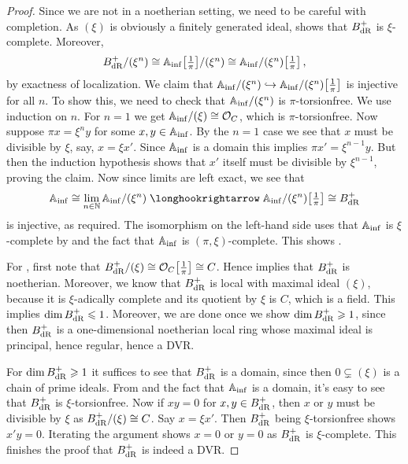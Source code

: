 \begin{proof}
	Since we are not in a noetherian setting, we need to be careful with completion. As $(\xi)$ is obviously a finitely generated ideal, \cite[]{stacks-project} shows that $B_{\mathrm{dR}}^+$ is $\xi$-complete. Moreover,
	\begin{equation*}
		B_{\mathrm{dR}}^+/(\xi^n)\cong \mathbb{A}_{\mathrm{inf}}\big[\textstyle\frac1\pi\big]/(\xi^n)\cong \mathbb{A}_{\mathrm{inf}}/(\xi^n)\big[\textstyle\frac1\pi\big]\,,
	\end{equation*}
	by exactness of localization. We claim that $\IA_\inf/(\xi^n)\monomorphism \IA_\inf/(\xi^n)\localize{\pi}$ is injective for all $n$. To show this, we need to check that $\mathbb{A}_{\mathrm{inf}}/(\xi^n)$ is $\pi$-torsionfree. We use induction on $n$. For $n=1$ we get $\mathbb{A}_{\mathrm{inf}}/(\xi)\cong \mathcal{O}_C$, which is $\pi$-torsionfree. Now suppose $\pi x=\xi^ny$ for some $x,y\in\mathbb{A}_{\mathrm{inf}}$. By the $n=1$ case we see that $x$ must be divisible by $\xi$, say, $x=\xi x'$. Since $\mathbb{A}_{\mathrm{inf}}$ is a domain this implies $\pi x'=\xi^{n-1}y$. But then the induction hypothesis shows that $x'$ itself must be divisible by $\xi^{n-1}$, proving the claim.
	Now since limits are left exact, we see that
	\begin{align*}
		\IA_\inf\cong \lim_{n\in \IN}\IA_\inf/(\xi^n)\monomorphism \IA_\inf/(\xi^n)\localize{\pi}\cong B_\dR^+
	\end{align*}
	is injective, as required. The isomorphism on the left-hand side uses that $\mathbb{A}_{\mathrm{inf}}$ is $\xi$-complete by \cite[]{stacks-project} and the fact that $\mathbb{A}_{\mathrm{inf}}$ is $(\pi,\xi)$-complete. This shows .
	
	For , first note that $B_{\mathrm{dR}}^+/(\xi)\cong \mathcal{O}_C\big[\textstyle\frac{1}{\pi}\big]\cong C$. Hence \cite[]{stacks-project} implies that $B_{\mathrm{dR}}^+$ is noetherian. Moreover, we know that $B_{\mathrm{dR}}^+$ is local with maximal ideal $(\xi)$, because it is $\xi$-adically complete and its quotient by $\xi$ is $C$, which is a field. This implies $\dim B_{\mathrm{dR}}^+\leqslant 1$. Moreover, we are done once we show $\dim B_{\mathrm{dR}}^+\geqslant 1$, since then $B_{\mathrm{dR}}^+$ is a one-dimensional noetherian local ring whose maximal ideal is principal, hence regular, hence a DVR.
	
	For $\dim B_{\mathrm{dR}}^+\geqslant 1$ it suffices to see that $B_{\mathrm{dR}}^+$ is a domain, since then $0\subsetneq (\xi)$ is a chain of prime ideals. From  and the fact that $\mathbb{A}_{\mathrm{inf}}$ is a domain, it's easy to see that $B_{\mathrm{dR}}^+$ is $\xi$-torsionfree. Now if $xy=0$ for $x,y\in B_{\mathrm{dR}}^+$, then $x$ or $y$ must be divisible by $\xi$ as $B_{\mathrm{dR}}^+/(\xi)\cong C$. Say $x=\xi x'$. Then $B_{\mathrm{dR}}^+$ being $\xi$-torsionfree shows $x'y=0$. Iterating the argument shows $x=0$ or $y=0$ as $B_{\mathrm{dR}}^+$ is $\xi$-complete. This finishes the proof that $B_{\mathrm{dR}}^+$ is indeed a DVR.
	

\end{proof}
